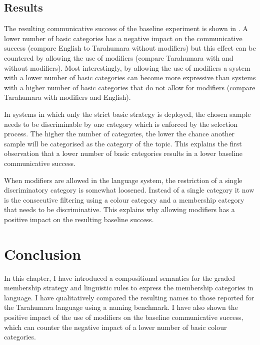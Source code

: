 \subsection{Results}
\label{s:gms-baseline-results}

The resulting communicative success of the baseline experiment is
shown in . A lower number of basic
categories has a negative impact on the communicative success (compare
English to Tarahumara without modifiers) but this effect can be
countered by allowing the use of modifiers (compare Tarahumara with
and without modifiers). Most interestingly, by allowing the use of
modifiers a system with a lower number of basic categories can become
more expressive than systems with a higher number of basic categories
that do not allow for modifiers (compare Tarahumara with modifiers
and English).

In systems in which only the strict basic strategy is deployed, the
chosen sample needs to be discriminable by one category which is
enforced by the selection process. The higher the number of
categories, the lower the chance another sample will be categorised as
the category of the topic. This explains the first observation that a
lower number of basic categories results in a lower baseline
communicative success.

When modifiers are allowed in the language system, the restriction of
a single discriminatory category is somewhat loosened. Instead of a
single category it now is the consecutive
filtering using a colour category and a membership category that needs
to be discriminative. This explains why allowing modifiers has a
positive impact on the resulting baseline success.


\section{Conclusion}

In this chapter, I have introduced a compositional semantics for the
graded membership strategy and linguistic rules to express the
membership categories in language. I have qualitatively compared the
resulting names to those reported for the Tarahumara language using a
naming benchmark. I have also shown the positive impact of the use of
modifiers on the baseline communicative success, which can counter the
negative impact of a lower number of basic colour categories.